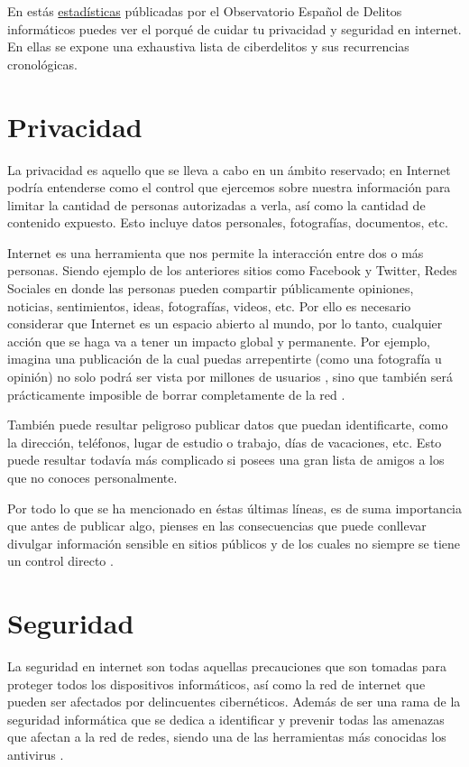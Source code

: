 \documentclass[
  spanish,
  a4paper,
  openany]{book}
\begin{document}
En estás \href{https://oedi.es/estadisticas/}{estadísticas} públicadas por el Observatorio Español de Delitos informáticos \citep{oedi} puedes ver el porqué de cuidar tu privacidad y seguridad en internet. En ellas se expone una exhaustiva lista de ciberdelitos y sus recurrencias cronológicas.

\hypertarget{privacidad}{%
\section{Privacidad}\label{privacidad}}

La privacidad es aquello que se lleva a cabo en un ámbito reservado; en Internet podría entenderse como el control que ejercemos sobre nuestra información para limitar la cantidad de personas autorizadas a verla, así como la cantidad de contenido expuesto. Esto incluye datos personales, fotografías, documentos, etc.

Internet es una herramienta que nos permite la interacción entre dos o más personas. Siendo ejemplo de los anteriores sitios como Facebook y Twitter, Redes Sociales en donde las personas pueden compartir públicamente opiniones, noticias, sentimientos, ideas, fotografías, videos, etc. Por ello es necesario considerar que Internet es un espacio abierto al mundo, por lo tanto, cualquier acción que se haga va a tener un impacto global y permanente. Por ejemplo, imagina una publicación de la cual puedas arrepentirte (como una fotografía u opinión) no solo podrá ser vista por millones de usuarios , sino que también será prácticamente imposible de borrar completamente de la red .

También puede resultar peligroso publicar datos que puedan identificarte, como la dirección, teléfonos, lugar de estudio o trabajo, días de vacaciones, etc. Esto puede resultar todavía más complicado si posees una gran lista de amigos a los que no conoces personalmente.

Por todo lo que se ha mencionado en éstas últimas líneas, es de suma importancia que antes de publicar algo, pienses en las consecuencias que puede conllevar divulgar información sensible en sitios públicos y de los cuales no siempre se tiene un control directo \citep{privacidad}.

\hypertarget{seguridad}{%
\section{Seguridad}\label{seguridad}}

La seguridad en internet son todas aquellas precauciones que son tomadas para proteger todos los dispositivos informáticos, así como la red de internet que pueden ser afectados por delincuentes cibernéticos. Además de ser una rama de la seguridad informática que se dedica a identificar y prevenir todas las amenazas que afectan a la red de redes, siendo una de las herramientas más conocidas los antivirus \citep{seguridad}.
\end{document}
